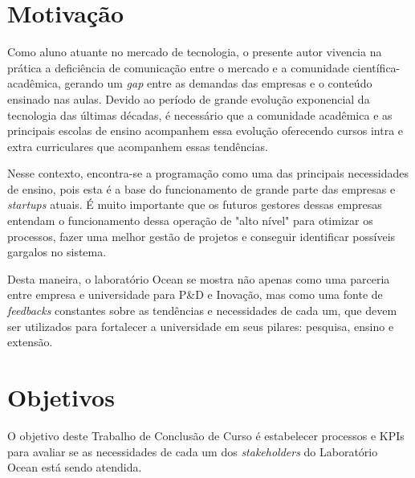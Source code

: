 \section{Motivação} %
\label{cha:motivacao}

Como aluno atuante no mercado de tecnologia, o presente autor vivencia na prática a deficiência de comunicação entre o mercado e a comunidade científica-acadêmica, gerando um \textit{gap} entre as demandas das empresas e o conteúdo ensinado nas aulas. Devido ao período de grande evolução exponencial da tecnologia das últimas décadas, é necessário que a comunidade acadêmica e as principais escolas de ensino acompanhem essa evolução oferecendo cursos intra e extra curriculares que acompanhem essas tendências.

Nesse contexto, encontra-se a programação como uma das principais necessidades de ensino, pois esta é a base do funcionamento de grande parte das empresas e \textit{startups} atuais. É muito importante que os futuros gestores dessas empresas entendam o funcionamento dessa operação de "alto nível" para otimizar os processos, fazer uma melhor gestão de projetos e conseguir identificar possíveis gargalos no sistema.

Desta maneira, o laboratório Ocean se mostra não apenas como uma parceria entre empresa e universidade para P\&D e Inovação, mas como uma fonte de \textit{feedbacks} constantes sobre as tendências e necessidades de cada um, que devem ser utilizados para fortalecer a universidade em seus pilares: pesquisa, ensino e extensão.

\section[Objetivos]{Objetivos}
\label{chap:objetivos}

O objetivo deste Trabalho de Conclusão de Curso é estabelecer processos e KPIs para avaliar se as necessidades de cada um dos \textit{stakeholders} do Laboratório Ocean está sendo atendida.